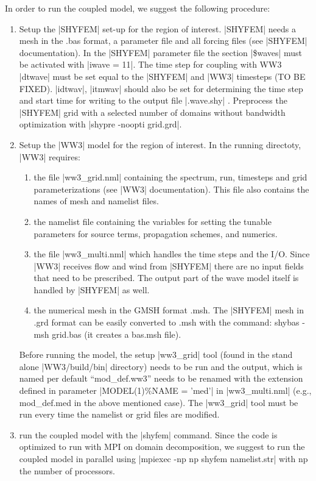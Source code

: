 In order to run the coupled model, we suggest the following
procedure:
\begin{enumerate}
\item Setup the |SHYFEM| set-up for the region of interest. 
|SHYFEM| needs a mesh in the .bas format, a parameter file and 
all forcing files (see |SHYFEM| documentation). In the |SHYFEM| 
parameter file the section |\$waves| must be activated with |iwave = 11|.
The time step for coupling with WW3 |dtwave| must be set equal
to the |SHYFEM| and |WW3| timesteps (TO BE FIXED).
|idtwav|, |itmwav| should also be set for determining the 
time step and start time for writing to the output file |.wave.shy| .
Preprocess the |SHYFEM| grid with a selected number of domains 
without bandwidth optimization with |shypre -noopti grid.grd|.

\item Setup the |WW3| model for the region of interest. In the
running directoty, |WW3| requires:
\begin{enumerate}
\item the file |ww3_grid.nml| containing the spectrum, run, timesteps
and grid parameterizations (see |WW3| documentation). This file also
contains the names of mesh and namelist files.
\item the namelist file containing the variables for setting
the tunable parameters for source terms, propagation schemes, and 
numerics.
\item the file |ww3_multi.nml| which handles the time steps and 
the I/O. Since |WW3| receives flow and wind from |SHYFEM| there are 
no input fields that need to be prescribed. The output part of the 
wave model itself is handled by |SHYFEM| as well.
\item the numerical mesh in the GMSH format .msh. The |SHYFEM|
mesh in .grd format can be easily converted to .msh with the command:
shybas -msh grid.bas (it creates a bas.msh file).
\end{enumerate}

Before running the model, the setup |ww3_grid| tool (found in the
stand alone |WW3/build/bin| directory) needs to be run and the output, 
which is named per default ``mod\_def.ww3'' needs to be renamed 
with the extension defined in parameter |MODEL(1)\%NAME = 'med'|
in |ww3_multi.nml| (e.g., mod\_def.med in the above mentioned case). 
The |ww3_grid| tool must be run every time the namelist or grid files 
are modified. 

\item run the coupled model with the |shyfem| command. Since the code
is optimized to run with MPI on domain decomposition, we suggest to
run the coupled model in parallel using |mpiexec -np np shyfem namelist.str| 
with np the number of processors.

\end{enumerate}

